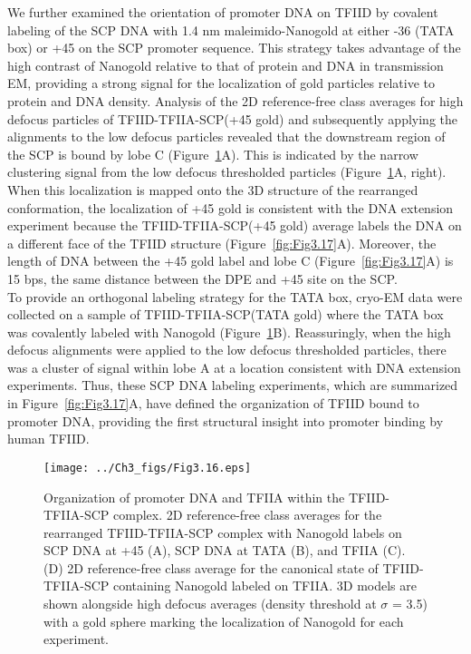 \indent We further examined the orientation of promoter DNA on TFIID by covalent labeling of the SCP DNA with 1.4 nm maleimido-Nanogold at either -36 (TATA box) or +45 on the SCP promoter sequence. This strategy takes advantage of the high contrast of Nanogold relative to that of protein and DNA in transmission EM, providing a strong signal for the localization of gold particles relative to protein and DNA density. Analysis of the 2D reference-free class averages for high defocus particles of TFIID-TFIIA-SCP(+45 gold) and subsequently applying the alignments to the low defocus particles revealed that the downstream region of the SCP is bound by lobe C (Figure~\ref{fig:Fig3.16}A). This is indicated by the narrow clustering signal from the low defocus thresholded particles (Figure~\ref{fig:Fig3.16}A, right). When this localization is mapped onto the 3D structure of the rearranged conformation, the localization of +45 gold is consistent with the DNA extension experiment because the TFIID-TFIIA-SCP(+45 gold) average labels the DNA on a different face of the TFIID structure (Figure~\ref{fig:Fig3.17}A). Moreover, the length of DNA between the +45 gold label and lobe C (Figure~\ref{fig:Fig3.17}A) is 15 bps, the same distance between the DPE and +45 site on the SCP.\\ 
\indent To provide an orthogonal labeling strategy for the TATA box, cryo-EM data were collected on a sample of TFIID-TFIIA-SCP(TATA gold) where the TATA box was covalently labeled with Nanogold (Figure~\ref{fig:Fig3.16}B). Reassuringly, when the high defocus alignments were applied to the low defocus thresholded particles, there was a cluster of signal within lobe A at a location consistent with DNA extension experiments. Thus, these SCP DNA labeling experiments, which are summarized in Figure~\ref{fig:Fig3.17}A, have defined the organization of TFIID bound to promoter DNA, providing the first structural insight into promoter binding by human TFIID. \\
\begin{figure}
\centering
\texttt{[image: ../Ch3\_figs/Fig3.16.eps]}
\caption[Organization of promoter DNA and TFIIA within the TFIID-TFIIA-SCP complex]{Organization of promoter DNA and TFIIA within the TFIID-TFIIA-SCP complex. 2D reference-free class averages for the rearranged TFIID-TFIIA-SCP complex with Nanogold labels on SCP DNA at +45 (A), SCP DNA at TATA (B), and TFIIA (C). (D) 2D reference-free class average for the canonical state of TFIID-TFIIA-SCP containing Nanogold labeled on TFIIA. 3D models are shown alongside high defocus averages (density threshold at $\sigma$ = 3.5) with a gold sphere marking the localization of Nanogold for each experiment. }
\label{fig:Fig3.16}
\end{figure}

